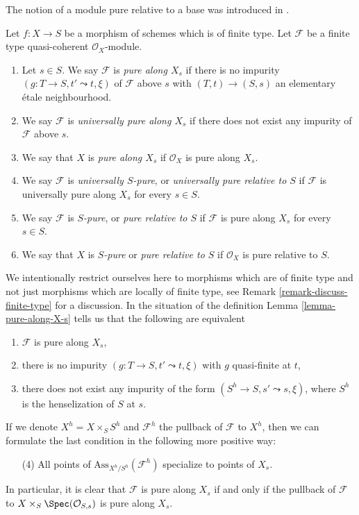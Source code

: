 \noindent
The notion of a module pure relative to a base was introduced in \cite{GruRay}.

\begin{definition}
\label{definition-pure}
Let $f : X \to S$ be a morphism of schemes which is of finite type.
Let $\mathcal{F}$ be a finite type quasi-coherent $\mathcal{O}_X$-module.
\begin{enumerate}
\item Let $s \in S$. We say $\mathcal{F}$ is {\it pure along $X_s$}
if there is no impurity $(g : T \to S, t' \leadsto t, \xi)$
of $\mathcal{F}$ above $s$ with $(T, t) \to (S, s)$ an
elementary \'etale neighbourhood.
\item We say $\mathcal{F}$ is {\it universally pure along $X_s$}
if there does not exist any impurity of $\mathcal{F}$ above $s$.
\item We say that $X$ is {\it pure along $X_s$} if $\mathcal{O}_X$
is pure along $X_s$.
\item We say $\mathcal{F}$ is {\it universally $S$-pure}, or
{\it universally pure relative to $S$} if $\mathcal{F}$ is universally
pure along $X_s$ for every $s \in S$.
\item We say $\mathcal{F}$ is {\it $S$-pure}, or
{\it pure relative to $S$} if $\mathcal{F}$ is pure along $X_s$
for every $s \in S$.
\item We say that $X$ is {\it $S$-pure} or {\it pure relative to $S$}
if $\mathcal{O}_X$ is pure relative to $S$.
\end{enumerate}
\end{definition}

\noindent
We intentionally restrict ourselves here to morphisms which are
of finite type and not just morphisms which are locally of
finite type, see
Remark \ref{remark-discuss-finite-type}
for a discussion. In the situation of the definition
Lemma \ref{lemma-pure-along-X-s}
tells us that the following are equivalent
\begin{enumerate}
\item $\mathcal{F}$ is pure along $X_s$,
\item there is no impurity $(g : T \to S, t' \leadsto t, \xi)$ with $g$
quasi-finite at $t$,
\item there does not exist any impurity of the form
$(S^h \to S, s' \leadsto s, \xi)$, where $S^h$ is the henselization
of $S$ at $s$.
\end{enumerate}
If we denote $X^h = X \times_S S^h$ and $\mathcal{F}^h$ the pullback
of $\mathcal{F}$ to $X^h$, then we can formulate the last condition
in the following more positive way:
\begin{enumerate}
\item[(4)] All points of $\text{Ass}_{X^h/S^h}(\mathcal{F}^h)$ specialize
to points of $X_s$.
\end{enumerate}
In particular, it is clear that $\mathcal{F}$ is pure along $X_s$
if and only if the pullback of $\mathcal{F}$ to
$X \times_S \Spec(\mathcal{O}_{S, s})$ is pure along $X_s$.

